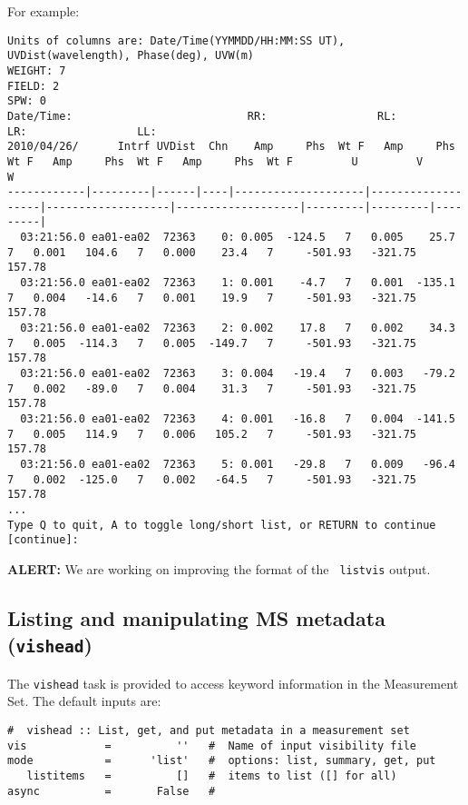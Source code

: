 For example:
\small
\begin{verbatim}
Units of columns are: Date/Time(YYMMDD/HH:MM:SS UT), UVDist(wavelength), Phase(deg), UVW(m)
WEIGHT: 7
FIELD: 2
SPW: 0
Date/Time:                           RR:                 RL:                 LR:                 LL:                                             
2010/04/26/      Intrf UVDist  Chn    Amp     Phs  Wt F   Amp     Phs  Wt F   Amp     Phs  Wt F   Amp     Phs  Wt F         U         V         W
------------|---------|------|----|--------------------|-------------------|-------------------|-------------------|---------|---------|---------|
  03:21:56.0 ea01-ea02  72363    0: 0.005  -124.5   7   0.005    25.7   7   0.001   104.6   7   0.000    23.4   7     -501.93   -321.75    157.78
  03:21:56.0 ea01-ea02  72363    1: 0.001    -4.7   7   0.001  -135.1   7   0.004   -14.6   7   0.001    19.9   7     -501.93   -321.75    157.78
  03:21:56.0 ea01-ea02  72363    2: 0.002    17.8   7   0.002    34.3   7   0.005  -114.3   7   0.005  -149.7   7     -501.93   -321.75    157.78
  03:21:56.0 ea01-ea02  72363    3: 0.004   -19.4   7   0.003   -79.2   7   0.002   -89.0   7   0.004    31.3   7     -501.93   -321.75    157.78
  03:21:56.0 ea01-ea02  72363    4: 0.001   -16.8   7   0.004  -141.5   7   0.005   114.9   7   0.006   105.2   7     -501.93   -321.75    157.78
  03:21:56.0 ea01-ea02  72363    5: 0.001   -29.8   7   0.009   -96.4   7   0.002  -125.0   7   0.002   -64.5   7     -501.93   -321.75    157.78
...
Type Q to quit, A to toggle long/short list, or RETURN to continue [continue]: 

\end{verbatim}
\normalsize

{\bf ALERT:} We are working on improving the format of the {\tt
  listvis} output.


\subsection{Listing and manipulating MS metadata ({\tt vishead})}
\label{section:io.vis.vishead}

The {\tt vishead} task is provided to access keyword information in
the Measurement Set.  The default inputs are:
\small
\begin{verbatim}
#  vishead :: List, get, and put metadata in a measurement set
vis            =          ''   #  Name of input visibility file
mode           =      'list'   #  options: list, summary, get, put
   listitems   =          []   #  items to list ([] for all)
async          =       False   #  
\end{verbatim}
\normalsize

